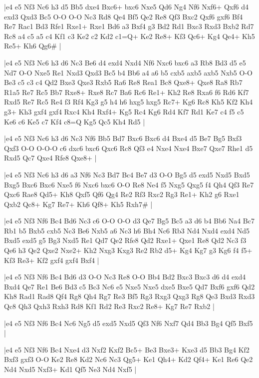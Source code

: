 \whitename{}
\blackname{}
\makegametitle
|e4 e5 Nf3 Nc6 h3 d5 Bb5 dxe4 Bxc6+ bxc6 Nxe5 Qd6 Ng4 Nf6 Nxf6+ Qxf6 d4 exd3 Qxd3 Bc5 O-O O-O Nc3 Rd8 Qe4 Bf5 Qe2 Re8 Qf3 Bxc2 Qxf6 gxf6 Bf4 Re7 Rac1 Bd3 Rfe1 Rxe1+ Rxe1 Bd6 a3 Bxf4 g3 Bd2 Rd1 Bxc3 Rxd3 Bxb2 Rd7 Rc8 a4 c5 a5 c4 Kf1 c3 Ke2 c2 Kd2 c1=Q+ Ke2 Re8+ Kf3 Qc6+ Kg4 Qe4+ Kh5 Re5+ Kh6 Qg6\#  |

\whitename{}
\blackname{}
\makegametitle
|e4 e5 Nf3 Nc6 h3 d6 Nc3 Be6 d4 exd4 Nxd4 Nf6 Nxc6 bxc6 a3 Rb8 Bd3 d5 e5 Nd7 O-O Nxe5 Re1 Nxd3 Qxd3 Bc5 b4 Bb6 a4 a6 b5 cxb5 axb5 axb5 Nxb5 O-O Be3 c5 c3 c4 Qd2 Bxe3 Qxe3 Rxb5 Ra6 Re8 Rea1 Bc8 Qxe8+ Qxe8 Ra8 Rb7 R1a5 Re7 Rc5 Bb7 Rxe8+ Rxe8 Rc7 Ba6 Rc6 Re1+ Kh2 Re8 Rxa6 f6 Rd6 Kf7 Rxd5 Re7 Rc5 Re4 f3 Rf4 Kg3 g5 h4 h6 hxg5 hxg5 Rc7+ Kg6 Rc8 Kh5 Kf2 Kh4 g3+ Kh3 gxf4 gxf4 Rxc4 Kh4 Rxf4+ Kg5 Rc4 Kg6 Rd4 Kf7 Rd1 Ke7 c4 f5 c5 Ke6 c6 Ke5 c7 Kf4 c8=Q Kg5 Qc5 Kh4 Rd5  |

\whitename{}
\blackname{}
\makegametitle
|e4 e5 Nf3 Nc6 h3 d6 Nc3 Nf6 Bb5 Bd7 Bxc6 Bxc6 d4 Bxe4 d5 Be7 Bg5 Bxf3 Qxf3 O-O O-O-O c6 dxc6 bxc6 Qxc6 Rc8 Qf3 e4 Nxe4 Nxe4 Bxe7 Qxe7 Rhe1 d5 Rxd5 Qc7 Qxe4 Rfe8 Qxe8+  |

\whitename{}
\blackname{}
\makegametitle
|e4 e5 Nf3 Nc6 h3 d6 a3 Nf6 Nc3 Bd7 Bc4 Be7 d3 O-O Bg5 d5 exd5 Nxd5 Bxd5 Bxg5 Bxc6 Bxc6 Nxe5 f6 Nxc6 bxc6 O-O Re8 Ne4 f5 Nxg5 Qxg5 f4 Qh4 Qf3 Re7 Qxc6 Rae8 Qd5+ Kh8 Qxf5 Qf6 Qg4 Re2 Rf3 Rxc2 Rg3 Re1+ Kh2 g6 Rxe1 Qxb2 Qc8+ Kg7 Re7+ Kh6 Qf8+ Kh5 Rxh7\#  |

\whitename{}
\blackname{}
\makegametitle
|e4 e5 Nf3 Nf6 Bc4 Bd6 Nc3 c6 O-O O-O d3 Qe7 Bg5 Bc5 a3 d6 b4 Bb6 Na4 Bc7 Rb1 b5 Bxb5 cxb5 Nc3 Be6 Nxb5 a6 Nc3 h6 Bh4 Nc6 Rb3 Nd4 Nxd4 exd4 Nd5 Bxd5 exd5 g5 Bg3 Nxd5 Re1 Qd7 Qe2 Rfe8 Qd2 Rxe1+ Qxe1 Re8 Qd2 Nc3 f3 Qe6 h3 Qe2 Qxe2 Nxe2+ Kh2 Nxg3 Kxg3 Re2 Rb2 d5+ Kg4 Kg7 g3 Kg6 f4 f5+ Kf3 Re3+ Kf2 gxf4 gxf4 Bxf4  |

\whitename{}
\blackname{}
\makegametitle
|e4 e5 Nf3 Nf6 Bc4 Bd6 d3 O-O Nc3 Re8 O-O Bb4 Bd2 Bxc3 Bxc3 d6 d4 exd4 Bxd4 Qe7 Re1 Be6 Bd3 c5 Bc3 Nc6 e5 Nxe5 Nxe5 dxe5 Bxe5 Qd7 Bxf6 gxf6 Qd2 Kh8 Rad1 Rad8 Qf4 Rg8 Qh4 Rg7 Re3 Bf5 Rg3 Rxg3 Qxg3 Rg8 Qe3 Bxd3 Rxd3 Qc8 Qh3 Qxh3 Rxh3 Rd8 Kf1 Rd2 Re3 Rxc2 Re8+ Kg7 Re7 Rxb2  |

\whitename{}
\blackname{}
\makegametitle
|e4 e5 Nf3 Nf6 Bc4 Nc6 Ng5 d5 exd5 Nxd5 Qf3 Nf6 Nxf7 Qd4 Bb3 Bg4 Qf5 Bxf5  |

\whitename{}
\blackname{}
\makegametitle
|e4 e5 Nf3 Nf6 Bc4 Nxe4 d3 Nxf2 Kxf2 Bc5+ Be3 Bxe3+ Kxe3 d5 Bb3 Bg4 Kf2 Bxf3 gxf3 O-O Ke2 Re8 Kd2 Nc6 Nc3 Qg5+ Ke1 Qh4+ Kd2 Qf4+ Ke1 Re6 Qe2 Nd4 Nxd5 Nxf3+ Kd1 Qf5 Ne3 Nd4 Nxf5  |

